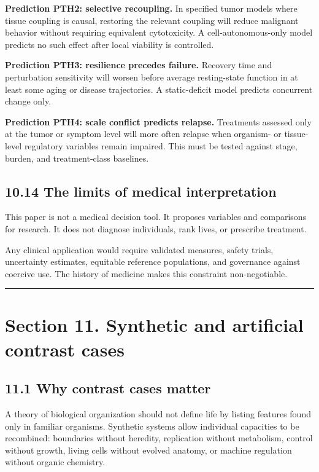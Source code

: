 \documentclass[
  11pt,
]{article}
\begin{document}
\textbf{Prediction PTH2: selective recoupling.} In specified tumor
models where tissue coupling is causal, restoring the relevant coupling
will reduce malignant behavior without requiring equivalent
cytotoxicity. A cell-autonomous-only model predicts no such effect after
local viability is controlled.

\textbf{Prediction PTH3: resilience precedes failure.} Recovery time and
perturbation sensitivity will worsen before average resting-state
function in at least some aging or disease trajectories. A
static-deficit model predicts concurrent change only.

\textbf{Prediction PTH4: scale conflict predicts relapse.} Treatments
assessed only at the tumor or symptom level will more often relapse when
organism- or tissue-level regulatory variables remain impaired. This
must be tested against stage, burden, and treatment-class baselines.

\subsection{10.14 The limits of medical
interpretation}\label{the-limits-of-medical-interpretation}

This paper is not a medical decision tool. It proposes variables and
comparisons for research. It does not diagnose individuals, rank lives,
or prescribe treatment.

Any clinical application would require validated measures, safety
trials, uncertainty estimates, equitable reference populations, and
governance against coercive use. The history of medicine makes this
constraint non-negotiable.

\begin{center}\rule{0.5\linewidth}{0.5pt}\end{center}

\section{Section 11. Synthetic and artificial contrast
cases}\label{section-11.-synthetic-and-artificial-contrast-cases}

\subsection{11.1 Why contrast cases
matter}\label{why-contrast-cases-matter}

A theory of biological organization should not define life by listing
features found only in familiar organisms. Synthetic systems allow
individual capacities to be recombined: boundaries without heredity,
replication without metabolism, control without growth, living cells
without evolved anatomy, or machine regulation without organic
chemistry.
\end{document}

